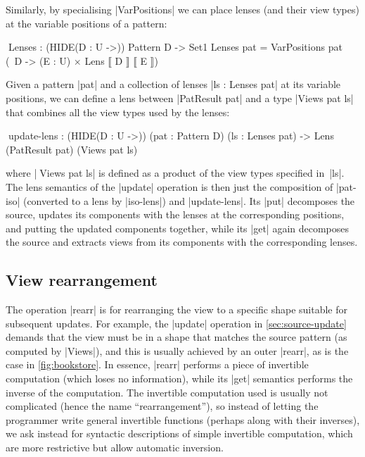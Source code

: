 \documentclass[fleqn]{llncs}
\begin{document}
Similarly, by specialising |VarPositions| we can place lenses (and their view types) at the variable positions of a pattern:
\begin{code}
^^^Lenses : (HIDE({D : U} ->)) Pattern D -> Set1
Lenses pat = VarPositions pat (\ D -> (E : U) × Lens ⟦ D ⟧ ⟦ E ⟧)
\end{code}
Given a pattern |pat| and a collection of lenses |ls : Lenses pat| at its variable positions, we can define a lens between |PatResult pat| and a type |Views pat ls| that combines all the view types used by the lenses:
\begin{code}
^^^update-lens : (HIDE({D : U} ->))
  (pat : Pattern D) (ls : Lenses pat) -> Lens (PatResult pat) (Views pat ls)
\end{code}
where |^^^Views pat ls| is defined as a product of the view types specified in~|ls|.
The lens semantics of the |update| operation is then just the composition of |pat-iso| (converted to a lens by |iso-lens|) and |update-lens|.
Its |put| decomposes the source, updates its components with the lenses at the corresponding positions, and putting the updated components together, while its |get| again decomposes the source and extracts views from its components with the corresponding lenses.

\subsection{View rearrangement}
\label{sec:view-rearrangement}

The operation |rearr| is for rearranging the view to a specific shape suitable for subsequent updates.
For example, the |update| operation in \autoref{sec:source-update} demands that the view must be in a shape that matches the source pattern (as computed by |Views|), and this is usually achieved by an outer |rearr|, as is the case in \autoref{fig:bookstore}.
In essence, |rearr| performs a piece of invertible computation (which loses no information), while its |get| semantics performs the inverse of the computation.
The invertible computation used is usually not complicated (hence the name ``rearrangement''), so instead of letting the programmer write general invertible functions (perhaps along with their inverses), we ask instead for syntactic descriptions of simple invertible computation, which are more restrictive but allow automatic inversion.
\end{document}
